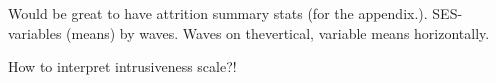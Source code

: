 Would be great to have attrition summary stats (for the appendix.). SES-variables (means) by waves. Waves on thevertical, variable means horizontally.


How to interpret intrusiveness scale?!